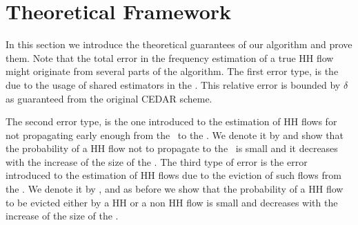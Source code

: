 \section{Theoretical Framework}
\label{sec:theory}
In this section we introduce the theoretical guarantees of our algorithm and prove them. Note that the total error in the frequency estimation of a true HH flow might originate from several parts of the algorithm. The first error type, is the \textit{\ee} due to the usage of shared estimators in the \sea. This relative error is bounded by $\delta$ as guaranteed from the original CEDAR scheme.

The second error type, is the one introduced to the estimation of HH flows for not propagating early enough from the \sfa\ to the \cs. We denote it by \textit{\pe} and show that the probability of a HH flow not to propagate to the \cs\ is small and it decreases with the increase of the size of the \sfa. The third type of error is the error introduced to the estimation of HH flows due to the eviction of such flows from the \cs. We denote it by \textit{\eve}, and as before we show that the probability of a HH flow to be evicted either by a HH or a non HH flow is small and decreases with the increase of the size of the \cs.

